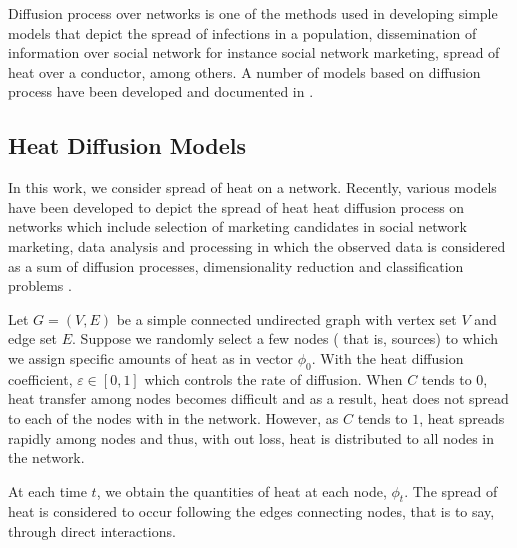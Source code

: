 \documentclass[10pt,a4paper]{article}
\begin{document}
    Diffusion process over networks is one of the methods used in developing simple models that depict the spread of infections in a population, dissemination of information over social network for instance social network marketing, spread of heat over a conductor, among others. A number of models based on diffusion process have been developed and documented in \citep{estrada2011epidemic,kasprzak2012diffusion,lopez2008diffusion}.
    
    \subsection{Heat Diffusion Models}
    In this work, we consider spread of heat on a network. Recently, various models have been developed to depict the spread of heat heat diffusion process on networks which include selection of marketing candidates in social network marketing, data analysis and processing in which the observed data is considered as a sum of diffusion processes, dimensionality reduction and classification problems   \citep{ma2008mining,thanou2017learning,belkin2003laplacian}.
    
    Let $G=(V,E)$ be a simple connected undirected graph with vertex set $V$ and edge set $E$. Suppose we randomly select a few nodes ( that is, sources) to which we assign specific amounts of heat as in vector $\phi_0$. With the heat diffusion coefficient, $\varepsilon \in [0,1]$ which controls the rate of diffusion. When $C$ tends to $0$, heat transfer among nodes becomes difficult and as a result, heat does not spread to each of the nodes with in the network. However, as $C$ tends to $1$, heat spreads rapidly among nodes and thus, with out loss, heat is distributed to all nodes in the network.
    
   At each time $t$, we obtain the quantities of heat at each node, $\phi_t$. The spread of heat is considered to occur following the edges connecting nodes, that is to say, through direct interactions.  
    	
\end{document}
